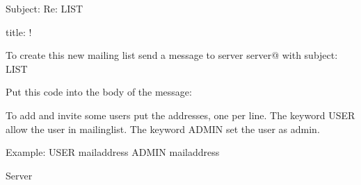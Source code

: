 Subject: Re: LIST %

title: !

To create this new mailing list send a message to server server@%
with subject:
LIST %

Put this code into the body of the message:

To add and invite some users put the addresses, one per line.
The keyword USER allow the user in mailinglist.
The keyword ADMIN set the user as admin.

Example:
USER mailaddress
ADMIN mailaddress

Server %